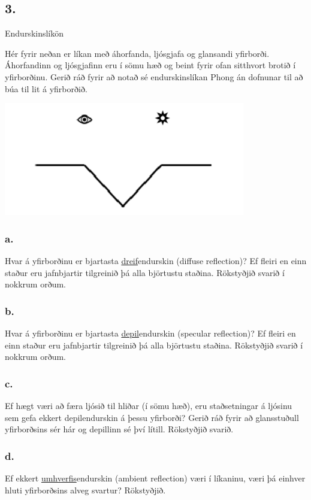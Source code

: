\documentclass{article}
\begin{document}
\newpage

\subsection{3.} Endurskinslíkön

Hér fyrir neðan er líkan með áhorfanda, ljósgjafa og glansandi yfirborði.
Áhorfandinn og ljósgjafinn eru í sömu hæð og beint fyrir ofan sitthvort brotið í
yfirborðinu. Gerið ráð fyrir að notað sé endurskinslíkan Phong án dofnunar til að
búa til lit á yfirborðið.

\begin{center}
\includegraphics[scale = 0.9]{myndir/Endurskin.png}
\end{center}


\subsubsection{a.}Hvar á yfirborðinu er bjartasta \underline{dreif}endurskin (diffuse reflection)? Ef fleiri en
einn staður eru jafnbjartir tilgreinið þá alla björtustu staðina. Rökstyðjið
svarið í nokkrum orðum.

\subsubsection{b.}Hvar á yfirborðinu er bjartasta \underline{depil}endurskin (specular reflection)? Ef fleiri
en einn staður eru jafnbjartir tilgreinið þá alla björtustu staðina. Rökstyðjið
svarið í nokkrum orðum.

\subsubsection{c.}Ef hægt væri að færa ljósið til hliðar (í sömu hæð), eru staðsetningar á ljósinu
sem gefa ekkert depilendurskin á þessu yfirborði? Gerið ráð fyrir að
glansstuðull yfirborðsins sér hár og depillinn sé því lítill. Rökstyðjið svarið.

\subsubsection{d.}Ef ekkert \underline{umhverfis}endurskin (ambient reflection) væri í líkaninu, væri þá
einhver hluti yfirborðsins alveg svartur? Rökstyðjið.
\end{document}
